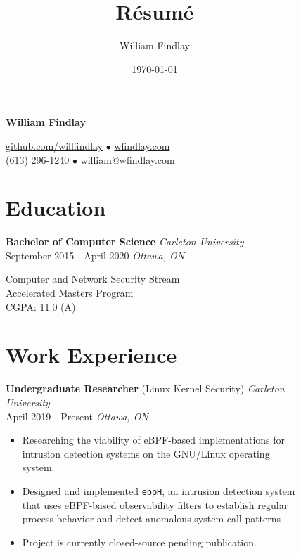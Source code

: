 \documentclass[]{article}
\title{Résumé}
\author{William Findlay}
\date{\today}
\theoremstyle{plain}
\theoremstyle{remark}
\theoremstyle{definition}
\renewcommand{\maketitle}{\relax}
\begin{document}
\maketitle

\begin{figure}
\small
\begin{minipage}[t]{0.65\textwidth}
\begin{center}
{\Huge\bfseries William Findlay}

\color{gray}

\href{https://www.github.com/willfindlay}{\color{gray}github.com/willfindlay} $\bullet$ \href{http://www.wfindlay.com}{\color{gray}wfindlay.com}\\
{\color{gray}(613) 296-1240} $\bullet$ \href{mailto:william@wfindlay.com}{\color{gray}william@wfindlay.com}
\end{center}

\color{gray}

\section{Education}
\color{black}
\textbf{Bachelor of Computer Science} \hfill \emph{Carleton University}\\
{September 2015 - April 2020} \hfill\emph {Ottawa, ON}
\color{gray}

Computer and Network Security Stream\\
Accelerated Masters Program\\
CGPA: 11.0 (A)

\section{Work Experience}

\color{black}
\textbf{Undergraduate Researcher} (Linux Kernel Security) \hfill \emph{Carleton University}\\
April 2019 - Present \hfill\emph {Ottawa, ON}
\color{gray}
\begin{itemize}[itemsep=0em]
\item Researching the viability of eBPF-based implementations for intrusion detection systems on the GNU/Linux operating system.
\item Designed and implemented \texttt{ebpH}, an intrusion detection system that uses eBPF-based observability filters to establish regular process behavior and detect anomalous system call patterns
\item Project is currently closed-source pending publication.
\end{itemize}


\end{minipage}
\end{figure}
\end{document}

